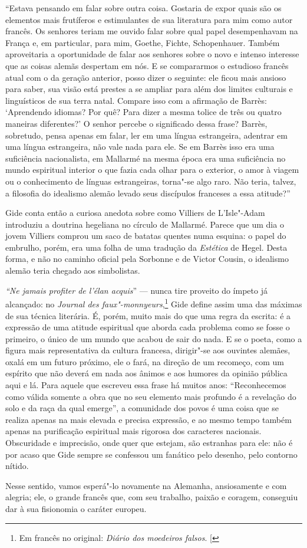 ``Estava pensando em falar sobre outra coisa. Gostaria de expor quais são
os elementos mais frutíferos e estimulantes de sua literatura para mim
como autor francês. Os senhores teriam me ouvido falar sobre qual papel
desempenhavam na França e, em particular, para mim, Goethe, Fichte,
Schopenhauer. Também aproveitaria a oportunidade de falar aos
senhores sobre o novo e intenso interesse que as coisas alemãs despertam em nós.
E se compararmos o estudioso francês atual com o da geração anterior,
posso dizer o seguinte: ele ficou mais ansioso para saber, sua visão
está prestes a se ampliar para além dos limites culturais e linguísticos
de sua terra natal. Compare isso com a afirmação de Barrès: `Aprendendo
idiomas? Por quê? Para dizer a mesma tolice de três ou quatro maneiras
diferentes?' O senhor percebe o significado dessa frase? Barrès,
sobretudo, pensa apenas em falar, ler em uma língua estrangeira,
adentrar em uma língua estrangeira, não vale nada para ele. Se em Barrès
isso era uma suficiência nacionalista, em Mallarmé na mesma época era
uma suficiência no mundo espiritual interior o que fazia cada olhar para
o exterior, o amor à viagem ou o conhecimento de línguas estrangeiras,
torna"-se algo raro. Não teria, talvez, a filosofia do idealismo alemão
levado seus discípulos franceses a essa atitude?''

Gide conta então a curiosa anedota sobre como Villiers de L'Isle"-Adam
introduziu a doutrina hegeliana no círculo de Mallarmé. Parece que um
dia o jovem Villiers comprou um saco de batatas quentes numa esquina:
o papel do embrulho, porém, era uma folha de uma tradução da
\emph{Estética} de Hegel. Desta forma, e não no caminho oficial pela
Sorbonne e de Victor Cousin, o idealismo alemão teria chegado aos
simbolistas.

\emph{``Ne jamais profiter de l'élan acquis}'' --- nunca tire proveito do
ímpeto já alcançado: no \emph{Journal des faux"-monnyeurs},\footnote{Em francês no original: \emph{Diário dos moedeiros falsos}. {[}\versal{N. T.}{]}} Gide define
assim uma das máximas de sua técnica literária. É, porém, muito mais do
que uma regra da escrita: é a expressão de uma atitude espiritual que
aborda cada problema como se fosse o primeiro, o único de um mundo que
acabou de sair do nada. E se o poeta, como a figura mais representativa
da cultura francesa, dirigir"-se aos ouvintes alemães, oxalá em um futuro
próximo, ele o fará, na direção de um recomeço, com um espírito
que não deverá em nada aos ânimos e aos humores da opinião pública aqui
e lá. Para aquele que escreveu essa frase há muitos anos:
``Reconhecemos como válida somente a obra que no seu elemento mais
profundo é a revelação do solo e da raça da qual emerge'', a comunidade
dos povos é uma coisa que se realiza apenas na mais elevada e precisa
expressão, e ao mesmo tempo também apenas na purificação espiritual mais
rigorosa dos caracteres nacionais. Obscuridade e imprecisão, onde quer
que estejam, são estranhas para ele: não é por acaso que Gide sempre se
confessou um fanático pelo desenho, pelo contorno nítido.

Nesse sentido, vamos esperá"-lo novamente na Alemanha, ansiosamente e com
alegria; ele, o grande francês que, com seu trabalho, paixão e
coragem, conseguiu dar à sua fisionomia o caráter europeu.

